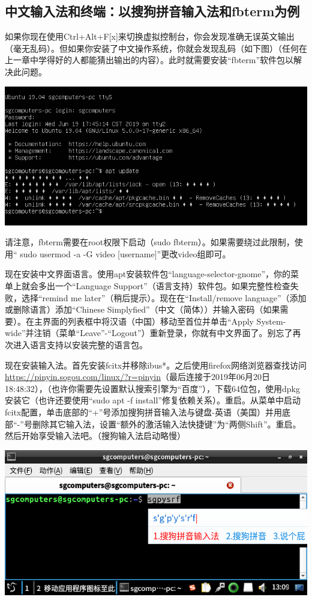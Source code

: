 \documentclass{book}
\begin{document}
\subsection{中文输入法和终端：以搜狗拼音输入法和fbterm为例}
如果你现在使用Ctrl+Alt+F[x]来切换虚拟控制台，你会发现准确无误英文输出（毫无乱码）。但如果你安装了中文操作系统，你就会发现乱码（如下图）（任何在上一章中学得好的人都能猜出输出的内容）。此时就需要安装“fbterm”软件包以解决此问题。
\begin{center}
	\includegraphics[scale=0.8]{pic/fbt1}
\end{center}
请注意，fbterm需要在root权限下启动（sudo fbterm）。如果需要绕过此限制，使用“
sudo usermod -a -G video [username]”更改video组即可。\par
现在安装中文界面语言。使用apt安装软件包“language-selector-gnome”，你的菜单上就会多出一个“Language Support”（语言支持）软件包。如果完整性检查失败，选择“remind me later”（稍后提示）。现在在“Install/remove language”（添加或删除语言）添加“Chinese Simplyfied”（中文（简体））并输入密码（如果需要）。在主界面的列表框中将汉语（中国）移动至首位并单击“Apply System-wide”并注销（菜单“Leave”-“Logout”）重新登录，你就有中文界面了。别忘了再次进入语言支持以安装完整的语言包。\par
现在安装输入法。首先安装fcitx并移除ibus*。之后使用firefox网络浏览器查找访问\url{https://pinyin.sogou.com/linux/?r=pinyin}（最后连接于2019年06月20日18:48:32），（也许你需要先设置默认搜索引擎为“百度”），下载64位包，使用dpkg安装它（也许还要使用“sudo apt -f install”修复依赖关系）。重启。从菜单中启动fcitx配置，单击底部的“+”号添加搜狗拼音输入法与键盘-英语（美国）并用底部“-”号删除其它输入法，设置“额外的激活输入法快捷键”为“两侧Shift”。重启。然后开始享受输入法吧。（搜狗输入法启动略慢）
\begin{center}
	\includegraphics[scale=0.7]{pic/fbt2}
\end{center}
\end{document}
